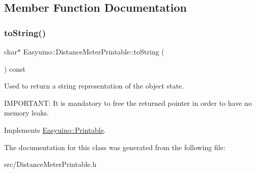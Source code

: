 \subsection{Member Function Documentation}
\mbox{\label{class_easyuino_1_1_distance_meter_printable_a42bb42319353c84294975ed5edc3a84c}} 
\subsubsection{\texorpdfstring{to\+String()}{toString()}}
{\footnotesize\ttfamily char$\ast$ Easyuino\+::\+Distance\+Meter\+Printable\+::to\+String (\begin{DoxyParamCaption}{ }\end{DoxyParamCaption}) const\hspace{0.3cm}{\ttfamily [virtual]}}



Used to return a string representation of the object state. 

I\+M\+P\+O\+R\+T\+A\+NT\+: It is mandatory to free the returned pointer in order to have no memory leaks. 

Implements \hyperlink{class_easyuino_1_1_printable_a49ae1c60dc0404600ee122c6c2684155}{Easyuino\+::\+Printable}.



The documentation for this class was generated from the following file\+:\begin{DoxyCompactItemize}
\item 
src/Distance\+Meter\+Printable.\+h\end{DoxyCompactItemize}
